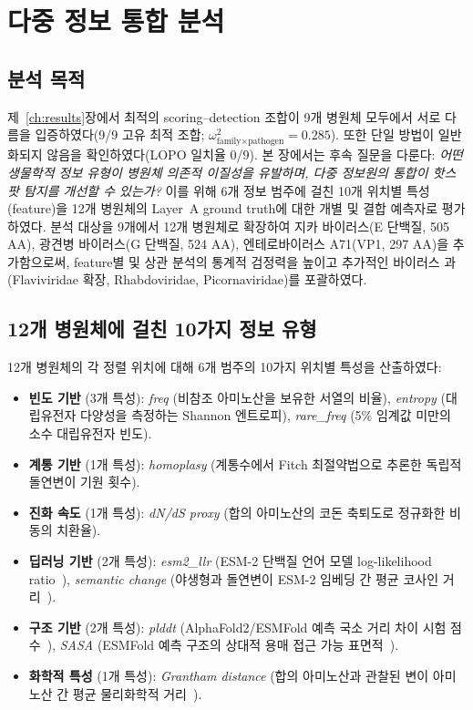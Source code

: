 \chapter{다중 정보 통합 분석}
\label{ch:adapt}

\section{분석 목적}
\label{sec:adapt_motivation}

제~\ref{ch:results}장에서 최적의 scoring--detection 조합이 9개 병원체 모두에서 서로 다름을 입증하였다(9/9 고유 최적 조합; $\omega^2_{\text{family}\times\text{pathogen}} = 0.285$). 또한 단일 방법이 일반화되지 않음을 확인하였다(LOPO 일치율 0/9).
본 장에서는 후속 질문을 다룬다: \textit{어떤 생물학적 정보 유형이 병원체 의존적 이질성을 유발하며, 다중 정보원의 통합이 핫스팟 탐지를 개선할 수 있는가?}
이를 위해 6개 정보 범주에 걸친 10개 위치별 특성(feature)을 12개 병원체의 Layer~A ground truth에 대한 개별 및 결합 예측자로 평가하였다.
분석 대상을 9개에서 12개 병원체로 확장하여 지카 바이러스(E 단백질, 505 AA), 광견병 바이러스(G 단백질, 524 AA), 엔테로바이러스 A71(VP1, 297 AA)을 추가함으로써, feature별 및 상관 분석의 통계적 검정력을 높이고 추가적인 바이러스 과(Flaviviridae 확장, Rhabdoviridae, Picornaviridae)를 포괄하였다.

\section{12개 병원체에 걸친 10가지 정보 유형}
\label{sec:10features}

12개 병원체의 각 정렬 위치에 대해 6개 범주의 10가지 위치별 특성을 산출하였다:

\begin{itemize}
\item \textbf{빈도 기반} (3개 특성): \textit{freq} (비참조 아미노산을 보유한 서열의 비율), \textit{entropy} (대립유전자 다양성을 측정하는 Shannon 엔트로피), \textit{rare\_freq} (5\% 임계값 미만의 소수 대립유전자 빈도).
\item \textbf{계통 기반} (1개 특성): \textit{homoplasy} (계통수에서 Fitch 최절약법으로 추론한 독립적 돌연변이 기원 횟수).
\item \textbf{진화 속도} (1개 특성): \textit{dN/dS proxy} (합의 아미노산의 코돈 축퇴도로 정규화한 비동의 치환율).
\item \textbf{딥러닝 기반} (2개 특성): \textit{esm2\_llr} (ESM-2 단백질 언어 모델 log-likelihood ratio~\cite{lin2023esm2,rives2021biological}), \textit{semantic change} (야생형과 돌연변이 ESM-2 임베딩 간 평균 코사인 거리~\cite{hie2021learning}).
\item \textbf{구조 기반} (2개 특성): \textit{plddt} (AlphaFold2/ESMFold 예측 국소 거리 차이 시험 점수~\cite{jumper2021alphafold}), \textit{SASA} (ESMFold 예측 구조의 상대적 용매 접근 가능 표면적~\cite{shrake1973environment}).
\item \textbf{화학적 특성} (1개 특성): \textit{Grantham distance} (합의 아미노산과 관찰된 변이 아미노산 간 평균 물리화학적 거리~\cite{grantham1974amino}).
\end{itemize}

